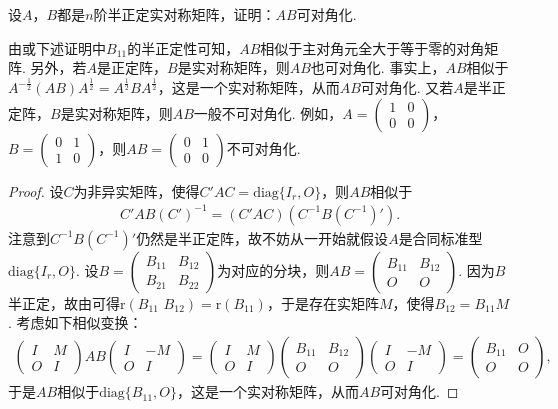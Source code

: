 \documentclass[../../main.tex]{subfiles}%
\begin{document}
\begin{proposition}\label{proposition:例9.73}
设\(A\)，\(B\)都是\(n\)阶半正定实对称矩阵，证明：\(AB\)可对角化.
\end{proposition}
\begin{remark}
由或下述证明中\(B_{11}\)的半正定性可知，\(AB\)相似于主对角元全大于等于零的对角矩阵. 另外，若\(A\)是正定阵，\(B\)是实对称矩阵，则\(AB\)也可对角化. 事实上，\(AB\)相似于\(A^{-\frac{1}{2}}(AB)A^{\frac{1}{2}}=A^{\frac{1}{2}}BA^{\frac{1}{2}}\)，这是一个实对称矩阵，从而\(AB\)可对角化. 又若\(A\)是半正定阵，\(B\)是实对称矩阵，则\(AB\)一般不可对角化. 例如，\(A=\begin{pmatrix}1&0\\0&0\end{pmatrix}\)，\(B=\begin{pmatrix}0&1\\1&0\end{pmatrix}\)，则\(AB=\begin{pmatrix}0&1\\0&0\end{pmatrix}\)不可对角化. 
\end{remark}
\begin{proof}
设\(C\)为非异实矩阵，使得\(C'AC = \mathrm{diag}\{I_r,O\}\)，则\(AB\)相似于
\begin{align*}
C'AB(C')^{-1}=(C'AC)(C^{-1}B(C^{-1})').
\end{align*}
注意到\(C^{-1}B(C^{-1})'\)仍然是半正定阵，故不妨从一开始就假设\(A\)是合同标准型\(\mathrm{diag}\{I_r,O\}\). 设\(B=\begin{pmatrix}B_{11}&B_{12}\\B_{21}&B_{22}\end{pmatrix}\)为对应的分块，则\(AB=\begin{pmatrix}B_{11}&B_{12}\\O&O\end{pmatrix}\). 因为\(B\)半正定，故由可得\(\mathrm{r}(B_{11}\,\,B_{12})=\mathrm{r}(B_{11})\)，于是存在实矩阵\(M\)，使得\(B_{12}=B_{11}M\). 考虑如下相似变换：
\begin{align*}
\begin{pmatrix}I&M\\O&I\end{pmatrix}AB\begin{pmatrix}I&-M\\O&I\end{pmatrix}=\begin{pmatrix}I&M\\O&I\end{pmatrix}\begin{pmatrix}B_{11}&B_{12}\\O&O\end{pmatrix}\begin{pmatrix}I&-M\\O&I\end{pmatrix}=\begin{pmatrix}B_{11}&O\\O&O\end{pmatrix},
\end{align*}
于是\(AB\)相似于\(\mathrm{diag}\{B_{11},O\}\)，这是一个实对称矩阵，从而\(AB\)可对角化.
\end{proof}
\end{document}
